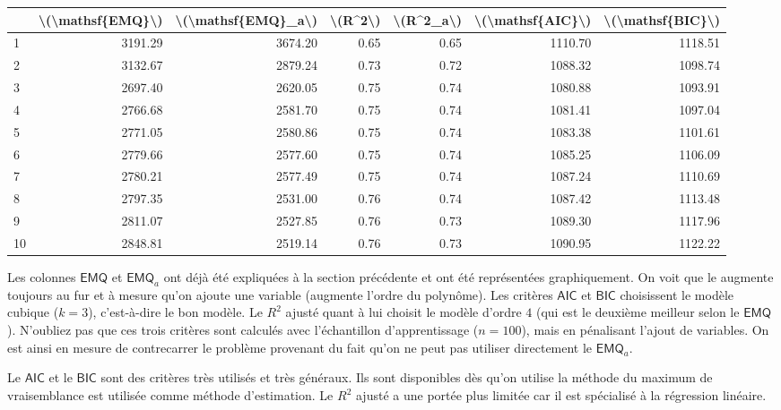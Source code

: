 \documentclass[
]{book}
\theoremstyle{definition}
\theoremstyle{definition}
\theoremstyle{definition}
\theoremstyle{remark}
\begin{document}
\begin{tabular}{l|r|r|r|r|r|r}
\hline
  & \textbackslash{}(\textbackslash{}mathsf\{EMQ\}\textbackslash{}) & \textbackslash{}(\textbackslash{}mathsf\{EMQ\}\_a\textbackslash{}) & \textbackslash{}(R\textasciicircum{}2\textbackslash{}) & \textbackslash{}(R\textasciicircum{}2\_a\textbackslash{}) & \textbackslash{}(\textbackslash{}mathsf\{AIC\}\textbackslash{}) & \textbackslash{}(\textbackslash{}mathsf\{BIC\}\textbackslash{})\\
\hline
1 & 3191.29 & 3674.20 & 0.65 & 0.65 & 1110.70 & 1118.51\\
\hline
2 & 3132.67 & 2879.24 & 0.73 & 0.72 & 1088.32 & 1098.74\\
\hline
3 & 2697.40 & 2620.05 & 0.75 & 0.74 & 1080.88 & 1093.91\\
\hline
4 & 2766.68 & 2581.70 & 0.75 & 0.74 & 1081.41 & 1097.04\\
\hline
5 & 2771.05 & 2580.86 & 0.75 & 0.74 & 1083.38 & 1101.61\\
\hline
6 & 2779.66 & 2577.60 & 0.75 & 0.74 & 1085.25 & 1106.09\\
\hline
7 & 2780.21 & 2577.49 & 0.75 & 0.74 & 1087.24 & 1110.69\\
\hline
8 & 2797.35 & 2531.00 & 0.76 & 0.74 & 1087.42 & 1113.48\\
\hline
9 & 2811.07 & 2527.85 & 0.76 & 0.73 & 1089.30 & 1117.96\\
\hline
10 & 2848.81 & 2519.14 & 0.76 & 0.73 & 1090.95 & 1122.22\\
\hline
\end{tabular}

Les colonnes \(\mathsf{EMQ}\) et \(\mathsf{EMQ}_a\) ont déjà été expliquées à la section précédente et ont été représentées graphiquement.
On voit que le augmente toujours au fur et à mesure qu'on ajoute une variable (augmente l'ordre du polynôme). Les critères \(\mathsf{AIC}\) et \(\mathsf{BIC}\) choisissent le modèle cubique (\(k=3\)), c'est-à-dire le bon modèle. Le \(R^2\) ajusté quant à lui choisit le modèle d'ordre \(4\) (qui est le deuxième meilleur selon le \(\mathsf{EMQ}\)). N'oubliez pas que ces trois critères sont calculés avec l'échantillon d'apprentissage (\(n=100\)), mais en pénalisant l'ajout de variables. On est ainsi en mesure de contrecarrer le problème provenant du fait qu'on ne peut pas utiliser directement le \(\mathsf{EMQ}_a\).

Le \(\mathsf{AIC}\) et le \(\mathsf{BIC}\) sont des critères très utilisés et très généraux. Ils sont disponibles dès qu'on utilise la méthode du maximum de vraisemblance est utilisée comme méthode d'estimation. Le \(R^2\) ajusté a une portée plus limitée car il est spécialisé à la régression linéaire.
\end{document}
